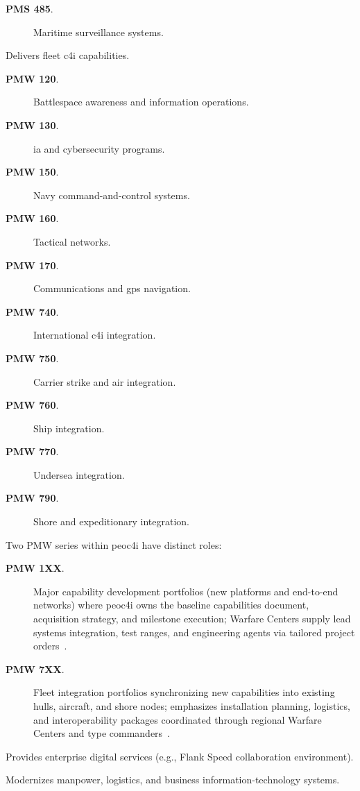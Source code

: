\documentclass[../main.tex]{subfiles}
\begin{document}
\begin{refsegment}
\begin{description}
\begin{description}
\begin{description}
                \item[\textbf{PMS 485}.] Maritime surveillance systems.
              \end{description}
      \end{description}
	\item[\textbf{\ac{peoc4i}.}] Delivers fleet \ac{c4i} capabilities.
      \begin{description}
        \item[\textbf{PMW 120}.] Battlespace awareness and information operations.
        \item[\textbf{PMW 130}.] \ac{ia} and cybersecurity programs.
        \item[\textbf{PMW 150}.] Navy command-and-control systems.
        \item[\textbf{PMW 160}.] Tactical networks.
        \item[\textbf{PMW 170}.] Communications and \ac{gps} navigation.
        \item[\textbf{PMW 740}.] International \ac{c4i} integration.
        \item[\textbf{PMW 750}.] Carrier strike and air integration.
        \item[\textbf{PMW 760}.] Ship integration.
        \item[\textbf{PMW 770}.] Undersea integration.
        \item[\textbf{PMW 790}.] Shore and expeditionary integration.
      \end{description}
	\item[PMW series focus.] Two PMW series within \ac{peoc4i} have distinct roles:
      \begin{description}
        \item[\textbf{PMW 1XX}.] Major capability development portfolios (new platforms and end-to-end networks) where \ac{peoc4i} owns the baseline capabilities document, acquisition strategy, and milestone execution; Warfare Centers supply lead systems integration, test ranges, and engineering agents via tailored project orders~\autocite{SECNAV5400-15D,edo-2-1-4-warfare-centers-2024}.
        \item[\textbf{PMW 7XX}.] Fleet integration portfolios synchronizing new capabilities into existing hulls, aircraft, and shore nodes; emphasizes installation planning, logistics, and interoperability packages coordinated through regional Warfare Centers and type commanders~\autocite{SECNAV5400-15D,edo-3-1-5-field-activity-fm-2025}.
      \end{description}
	\item[\textbf{\ac{peodigital}.}] Provides enterprise digital services (e.g., Flank Speed collaboration environment).
	\item[\textbf{\ac{peomlb}.}] Modernizes manpower, logistics, and business information-technology systems.
\end{description}


\end{refsegment}
\end{document}
